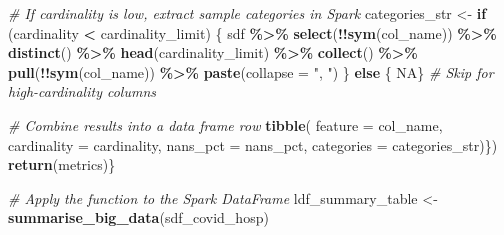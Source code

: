 \documentclass[
]{article}
\newenvironment{Shaded}{\begin{snugshade}}{\end{snugshade}}
\newcommand{\AttributeTok}[1]{\textcolor[rgb]{0.13,0.29,0.53}{#1}}
\newcommand{\CommentTok}[1]{\textcolor[rgb]{0.56,0.35,0.01}{\textit{#1}}}
\newcommand{\ConstantTok}[1]{\textcolor[rgb]{0.56,0.35,0.01}{#1}}
\newcommand{\ControlFlowTok}[1]{\textcolor[rgb]{0.13,0.29,0.53}{\textbf{#1}}}
\newcommand{\FunctionTok}[1]{\textcolor[rgb]{0.13,0.29,0.53}{\textbf{#1}}}
\newcommand{\NormalTok}[1]{#1}
\newcommand{\OtherTok}[1]{\textcolor[rgb]{0.56,0.35,0.01}{#1}}
\newcommand{\SpecialCharTok}[1]{\textcolor[rgb]{0.81,0.36,0.00}{\textbf{#1}}}
\newcommand{\StringTok}[1]{\textcolor[rgb]{0.31,0.60,0.02}{#1}}
\begin{document}
\begin{Shaded}
\begin{Highlighting}[]
    \CommentTok{\# If cardinality is low, extract sample categories in Spark}
\NormalTok{    categories\_str }\OtherTok{\textless{}{-}} \ControlFlowTok{if}\NormalTok{ (cardinality }\SpecialCharTok{\textless{}}\NormalTok{ cardinality\_limit) \{}
\NormalTok{      sdf }\SpecialCharTok{\%\textgreater{}\%}
        \FunctionTok{select}\NormalTok{(}\SpecialCharTok{!!}\FunctionTok{sym}\NormalTok{(col\_name)) }\SpecialCharTok{\%\textgreater{}\%}
        \FunctionTok{distinct}\NormalTok{() }\SpecialCharTok{\%\textgreater{}\%}
        \FunctionTok{head}\NormalTok{(cardinality\_limit) }\SpecialCharTok{\%\textgreater{}\%}
        \FunctionTok{collect}\NormalTok{() }\SpecialCharTok{\%\textgreater{}\%}
        \FunctionTok{pull}\NormalTok{(}\SpecialCharTok{!!}\FunctionTok{sym}\NormalTok{(col\_name)) }\SpecialCharTok{\%\textgreater{}\%}
        \FunctionTok{paste}\NormalTok{(}\AttributeTok{collapse =} \StringTok{", "}\NormalTok{)}
\NormalTok{    \} }\ControlFlowTok{else}\NormalTok{ \{}
      \ConstantTok{NA}\NormalTok{\}  }\CommentTok{\# Skip for high{-}cardinality columns}
  
    \CommentTok{\# Combine results into a data frame row}
    \FunctionTok{tibble}\NormalTok{(}
      \AttributeTok{feature =}\NormalTok{ col\_name,}
      \AttributeTok{cardinality =}\NormalTok{ cardinality,}
      \AttributeTok{nans\_pct =}\NormalTok{ nans\_pct,}
      \AttributeTok{categories =}\NormalTok{ categories\_str)\})}
  \FunctionTok{return}\NormalTok{(metrics)\}}

\CommentTok{\# Apply the function to the Spark DataFrame}
\NormalTok{ldf\_summary\_table }\OtherTok{\textless{}{-}} \FunctionTok{summarise\_big\_data}\NormalTok{(sdf\_covid\_hosp)}


\end{Highlighting}
\end{Shaded}
\end{document}
